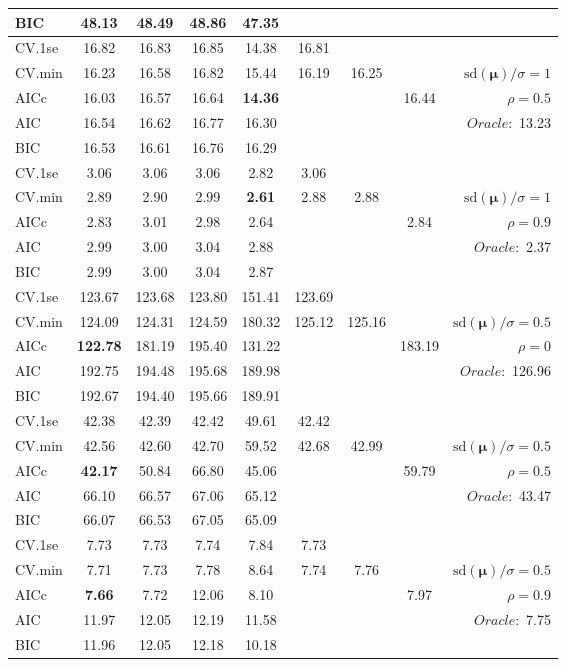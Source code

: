 \begin{table}
\begin{center}
\begin{tabular}{l*{7}{c}|r}
BIC & 48.13 & 48.49 & 48.86 & 47.35 & & & &  \\
 \hline 
CV.1se & 16.82 & 16.83 & 16.85 & 14.38 & 16.81 & & & \\
CV.min & 16.23 & 16.58 & 16.82 & 15.44 & 16.19 & 16.25 & & $\mathrm{sd}(\mathbf{\mu})/\sigma=1$ \\
AICc & 16.03 & 16.57 & 16.64 & {\bf 14.36} & & & 16.44 &  $\rho=0.5$ \\
AIC & 16.54 & 16.62 & 16.77 & 16.30 & & & &  \multirow{2}{*}{$Oracle: $ 13.23} \\
BIC & 16.53 & 16.61 & 16.76 & 16.29 & & & &  \\
 \hline 
CV.1se & 3.06 & 3.06 & 3.06 & 2.82 & 3.06 & & & \\
CV.min & 2.89 & 2.90 & 2.99 & {\bf 2.61} & 2.88 & 2.88 & & $\mathrm{sd}(\mathbf{\mu})/\sigma=1$ \\
AICc & 2.83 & 3.01 & 2.98 & 2.64 & & & 2.84 &  $\rho=0.9$ \\
AIC & 2.99 & 3.00 & 3.04 & 2.88 & & & &  \multirow{2}{*}{$Oracle: $ 2.37} \\
BIC & 2.99 & 3.00 & 3.04 & 2.87 & & & &  \\
 \hline 
CV.1se & 123.67 & 123.68 & 123.80 & 151.41 & 123.69 & & & \\
CV.min & 124.09 & 124.31 & 124.59 & 180.32 & 125.12 & 125.16 & & $\mathrm{sd}(\mathbf{\mu})/\sigma=0.5$ \\
AICc & {\bf 122.78} & 181.19 & 195.40 & 131.22 & & & 183.19 &  $\rho=0$ \\
AIC & 192.75 & 194.48 & 195.68 & 189.98 & & & &  \multirow{2}{*}{$Oracle: $ 126.96} \\
BIC & 192.67 & 194.40 & 195.66 & 189.91 & & & &  \\
 \hline 
CV.1se & 42.38 & 42.39 & 42.42 & 49.61 & 42.42 & & & \\
CV.min & 42.56 & 42.60 & 42.70 & 59.52 & 42.68 & 42.99 & & $\mathrm{sd}(\mathbf{\mu})/\sigma=0.5$ \\
AICc & {\bf 42.17} & 50.84 & 66.80 & 45.06 & & & 59.79 &  $\rho=0.5$ \\
AIC & 66.10 & 66.57 & 67.06 & 65.12 & & & &  \multirow{2}{*}{$Oracle: $ 43.47} \\
BIC & 66.07 & 66.53 & 67.05 & 65.09 & & & &  \\
 \hline 
CV.1se & 7.73 & 7.73 & 7.74 & 7.84 & 7.73 & & & \\
CV.min & 7.71 & 7.73 & 7.78 & 8.64 & 7.74 & 7.76 & & $\mathrm{sd}(\mathbf{\mu})/\sigma=0.5$ \\
AICc & {\bf 7.66} & 7.72 & 12.06 & 8.10 & & & 7.97 &  $\rho=0.9$ \\
AIC & 11.97 & 12.05 & 12.19 & 11.58 & & & &  \multirow{2}{*}{$Oracle: $ 7.75} \\
BIC & 11.96 & 12.05 & 12.18 & 10.18 & & & &  \\
 \hline 
\end{tabular}
\end{center}
\vspace{-1cm}
\end{table}




